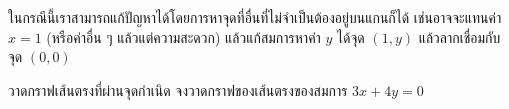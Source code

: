 \begin{enumerate}
\begin{center}
    \end{center}
    ในกรณีนี้เราสามารถแก้ปัญหาได้โดยการหาจุดที่อื่นที่ไม่จำเป็นต้องอยู่บนแกนก็ได้ เช่นอาจจะแทนค่า $x=1$ (หรือค่าอื่น ๆ แล้วแต่ความสะดวก) แล้วแก้สมการหาค่า $y$ ได้จุด $(1,y)$ แล้วลากเชื่อมกับจุด $(0,0)$
    \begin{example}
        {วาดกราฟเส้นตรงที่ผ่านจุดกำเนิด}{}
        จงวาดกราฟของเส้นตรงของสมการ $3x + 4y = 0$
    \end{example}
\end{enumerate}
\newpage
